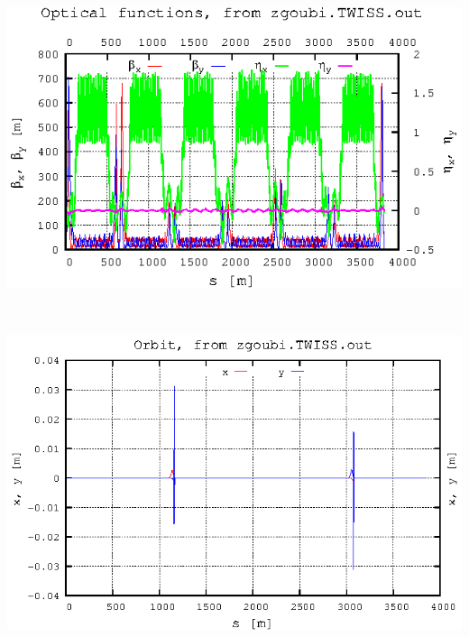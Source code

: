 \documentclass[10pt]{article}
\begin{document}
\begin{minipage}{1.\linewidth}
\begin{minipage}{.49\linewidth}
~

\includegraphics*[width=.99\linewidth]{gnuplot_TWISS_btxy_snakesOn.eps} 

~

\includegraphics*[width=.99\linewidth]{gnuplot_TWISS_xy_snakesOn.eps} 


\end{minipage}

\end{minipage}
\end{document}
